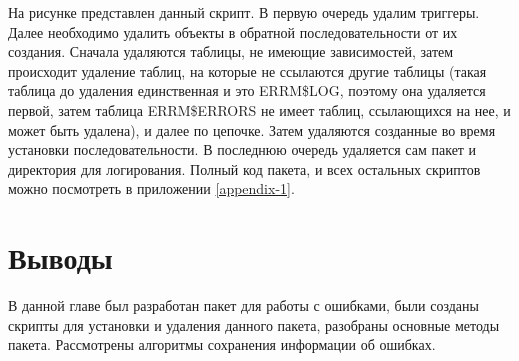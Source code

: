 На рисунке  представлен данный скрипт. В первую очередь удалим триггеры. Далее необходимо удалить объекты в обратной последовательности от их создания. Сначала удаляются таблицы, не имеющие зависимостей, затем происходит удаление таблиц, на которые не ссылаются другие таблицы (такая таблица до удаления единственная и это ERRM\$LOG, поэтому она удаляется первой, затем таблица ERRM\$ERRORS не имеет таблиц, ссылающихся на нее, и может быть удалена), и далее по цепочке. Затем удаляются созданные во время установки последовательности. В последнюю очередь удаляется сам пакет и директория для логирования.
Полный код пакета, и всех остальных скриптов можно посмотреть в приложении \ref{appendix-1}. 


\section{Выводы} \label{ch3:conclusion}


В данной главе был разработан пакет для работы с ошибками, были созданы скрипты для установки и удаления данного пакета, разобраны основные методы пакета. Рассмотрены алгоритмы сохранения информации об ошибках. 


%
